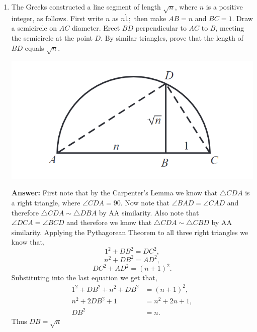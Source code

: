 \documentclass[12pt]{article}
\theoremstyle{homework}
\begin{document}
\begin{enumerate}
\item The Greeks constructed a line segment of length $\sqrt{n}$, where $n$ is a positive integer, as 
follows. First write $n$ as $n \dot 1;$ then make $AB = n$ and $BC = 1$. Draw a semicircle on $AC$ diameter. Erect $BD$ 
perpendicular to $AC$ to $B$, meeting the semicircle at the point $D$. By similar triangles, prove that the length of $BD$ equals $\sqrt{n}$.\\
\begin{center}
  \includegraphics[width = .50\textwidth]{rootn.png}
\end{center}  

\textbf{Answer:} First note that by the Carpenter's Lemma we know that $\triangle CDA$ is a right triangle, where $\angle CDA = 90$. 
Now note that $\angle BAD = \angle CAD$ and therefore $\triangle CDA \sim \triangle DBA$ by AA similarity. Also note that $\angle DCA = \angle BCD$
and therefore we know that $\triangle CDA \sim \triangle CBD$ by AA similarity. Applying the Pythagorean Theorem to all three right triangles we know that, 
\begin{equation*}
  1^2 + DB^2 = DC^2,
\end{equation*} 
\begin{equation*}
  n^2 + DB^2 = AD^2,
\end{equation*} 
\begin{equation*}
  DC^2 + AD^2 = (n+1)^2.
\end{equation*} 
Substituting into the last equation we get that,
\begin{align*}
  1^2 + DB^2 + n^2 + DB^2 &= (n+1)^2,\\
  n^2 + 2DB^2 + 1 &= n^2 + 2n + 1,\\
  DB^2&= n.
\end{align*}
Thus $DB =\sqrt{n}$


\vspace{.5in}






\end{enumerate}
\end{document}
